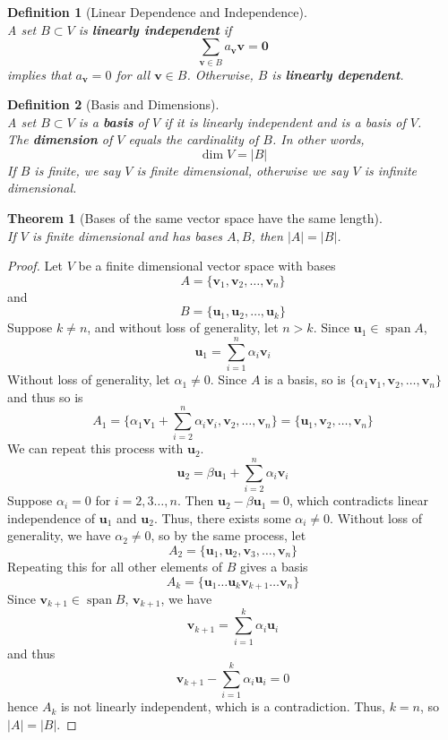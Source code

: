 \documentclass[12pt]{article}
\newtheorem{thm}{Theorem}[section] %
\theoremstyle{plain}
\newtheorem{definition}{Definition}[section]
\DeclareMathOperator{\spn}{span}
\DeclareMathOperator{\vdim}{dim}
\newcommand{\vv}{\mathbf{v}}
\newcommand{\vu}{\mathbf{u}}
\newcommand{\vzero}{\mathbf{0}}
\begin{document}
    \begin{definition}[Linear Dependence and Independence]
        ~\\A set $B \subset V$ is \textbf{linearly independent} if $$\sum_{\vv \in B} a_{\vv} \vv = \vzero$$implies that $a_{\vv} = 0$ for all $\vv \in B$. Otherwise, $B$ is \textbf{linearly dependent}.
    \end{definition}

    \begin{definition}[Basis and Dimensions]
        ~\\A set $B \subset V$ is a \textbf{basis} of $V$ if it is linearly independent and is a basis of $V$.\\The \textbf{dimension} of $V$ equals the cardinality of $B$. In other words, $$\vdim V = |B|$$If $B$ is finite, we say $V$ is finite dimensional, otherwise we say $V$ is infinite dimensional.
    \end{definition}

    \begin{thm}[Bases of the same vector space have the same length]
        ~\\If $V$ is finite dimensional and has bases $A, B$, then $|A| = |B|$.
    \end{thm}

    \begin{proof}
        Let $V$ be a finite dimensional vector space with bases $$A = \{\vv_1, \vv_2, \dots, \vv_n\}$$ and $$B = \{\vu_1, \vu_2, \dots, \vu_k\}$$Suppose $k \neq n$, and without loss of generality, let $n > k$. Since $\vu_1 \in \spn A$, $$\vu_1 = \sum_{i = 1}^n \alpha_i \vv_i$$
        Without loss of generality, let $\alpha_1 \neq 0$. Since $A$ is a basis, so is $\{\alpha_1 \vv_1, \vv_2, \dots, \vv_n\}$ and thus so is $$A_1 = \{\alpha_1 \vv_1 + \sum_{i = 2}^n \alpha_i \vv_i, \vv_2, \dots, \vv_n\} = \{\vu_1, \vv_2, \dots, \vv_n\}$$We can repeat this process with $\vu_2$.$$\vu_2 = \beta \vu_1 + \sum_{i = 2}^n \alpha_i \vv_i$$Suppose $\alpha_i = 0$ for $i = 2, 3 \dots, n$. Then $\vu_2 - \beta \vu_1 =0$, which contradicts linear independence of $\vu_1$ and $\vu_2$. Thus, there exists some $\alpha_i \neq 0$. Without loss of generality, we have $\alpha_2 \neq 0$, so by the same process, let $$A_2 = \{\vu_1, \vu_2, \vv_3, \dots, \vv_n\}$$Repeating this for all other elements of $B$ gives a basis $$A_k = \{\vu_1 \dots \vu_k \vv_{k+1} \dots \vv_n\}$$Since $\vv_{k+1} \in \spn B$, $\vv_{k+1}$, we have $$\vv_{k+1} = \sum_{i = 1}^k \alpha_i \vu_i$$and thus $$\vv_{k+1} - \sum_{i = 1}^k \alpha_i \vu_i = 0$$hence $A_k$ is not linearly independent, which is a contradiction. Thus, $k = n$, so $|A| = |B|$.
    \end{proof}
\end{document}
